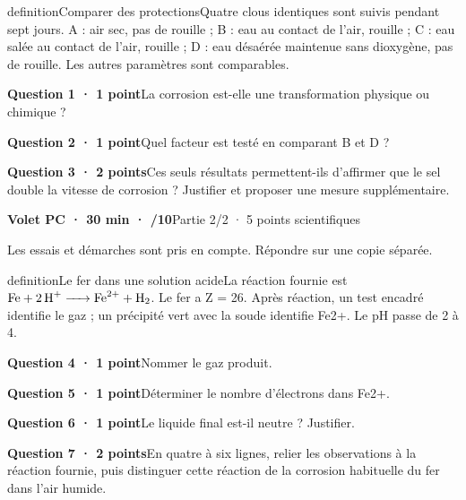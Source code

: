 \begin{pcEncadre}{definition}{Comparer des protections}Quatre clous identiques sont suivis pendant sept jours. A : air sec, pas de rouille ; B : eau au contact de l’air, rouille ; C : eau salée au contact de l’air, rouille ; D : eau désaérée maintenue sans dioxygène, pas de rouille. Les autres paramètres sont comparables.\end{pcEncadre}
\par\addvspace{3mm}\noindent\textbf{Question 1 · 1 point}\quad La corrosion est-elle une transformation physique ou chimique ?\par
\par\addvspace{3mm}\noindent\textbf{Question 2 · 1 point}\quad Quel facteur est testé en comparant B et D ?\par
\par\addvspace{3mm}\noindent\textbf{Question 3 · 2 points}\quad Ces seuls résultats permettent-ils d’affirmer que le sel double la vitesse de corrosion ? Justifier et proposer une mesure supplémentaire.\par
\vfill{}
\noindent\textbf{Volet PC · 30 min · /10}\hfill Partie 2/2 · 5 points scientifiques
\par\vspace{2mm}Les essais et démarches sont pris en compte. Répondre sur une copie séparée.\par
\begin{pcEncadre}{definition}{Le fer dans une solution acide}La réaction fournie est $\ce{Fe + 2 H+ -> Fe^{2+} + H2}$. Le fer a Z = 26. Après réaction, un test encadré identifie le gaz ; un précipité vert avec la soude identifie Fe2+. Le pH passe de 2 à 4.\end{pcEncadre}
\par\addvspace{3mm}\noindent\textbf{Question 4 · 1 point}\quad Nommer le gaz produit.\par
\par\addvspace{3mm}\noindent\textbf{Question 5 · 1 point}\quad Déterminer le nombre d’électrons dans Fe2+.\par
\par\addvspace{3mm}\noindent\textbf{Question 6 · 1 point}\quad Le liquide final est-il neutre ? Justifier.\par
\par\addvspace{3mm}\noindent\textbf{Question 7 · 2 points}\quad En quatre à six lignes, relier les observations à la réaction fournie, puis distinguer cette réaction de la corrosion habituelle du fer dans l’air humide.\par
